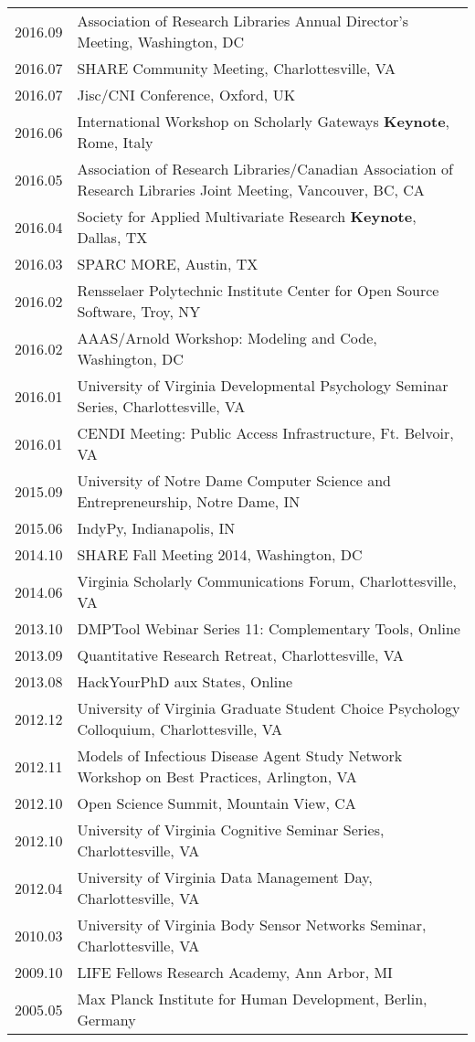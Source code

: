 \documentclass[11pt]{article}
\begin{document}
\begin{tabularx}{\textwidth}{lX}
    2016.09     & Association of Research Libraries Annual Director's Meeting, Washington, DC\\ %
    2016.07     & SHARE Community Meeting, Charlottesville, VA\\
    2016.07     & Jisc/CNI Conference, Oxford, UK\\
    2016.06     & International Workshop on Scholarly Gateways \textbf{Keynote}, Rome, Italy\\
    2016.05     & Association of Research Libraries/Canadian Association of Research Libraries Joint Meeting, Vancouver, BC, CA\\
    2016.04     & Society for Applied Multivariate Research \textbf{Keynote}, Dallas, TX\\
    2016.03     & SPARC MORE, Austin, TX\\
    2016.02     & Rensselaer Polytechnic Institute Center for Open Source Software, Troy, NY\\
    2016.02     & AAAS/Arnold Workshop: Modeling and Code, Washington, DC\\
    2016.01     & University of Virginia Developmental Psychology Seminar Series, Charlottesville, VA\\
    2016.01     & CENDI Meeting: Public Access Infrastructure, Ft. Belvoir, VA\\
    2015.09     & University of Notre Dame Computer Science and Entrepreneurship, Notre Dame, IN\\
    2015.06     & IndyPy, Indianapolis, IN\\
    2014.10     & SHARE Fall Meeting 2014, Washington, DC\\
    2014.06     & Virginia Scholarly Communications Forum, Charlottesville, VA\\
    2013.10     & DMPTool Webinar Series 11: Complementary Tools, Online\\
    2013.09     & Quantitative Research Retreat, Charlottesville, VA\\
    2013.08     & HackYourPhD aux States, Online\\
    2012.12     & University of Virginia Graduate Student Choice Psychology Colloquium, Charlottesville, VA\\
    2012.11     & Models of Infectious Disease Agent Study Network Workshop on Best Practices, Arlington, VA\\
    2012.10     & Open Science Summit, Mountain View, CA\\
    2012.10     & University of Virginia Cognitive Seminar Series, Charlottesville, VA\\
    2012.04     & University of Virginia Data Management Day, Charlottesville, VA\\
    2010.03     & University of Virginia Body Sensor Networks Seminar, Charlottesville, VA\\
    2009.10     & LIFE Fellows Research Academy, Ann Arbor, MI\\
    2005.05     & Max Planck Institute for Human Development, Berlin, Germany\\
\end{tabularx}
\end{document}
